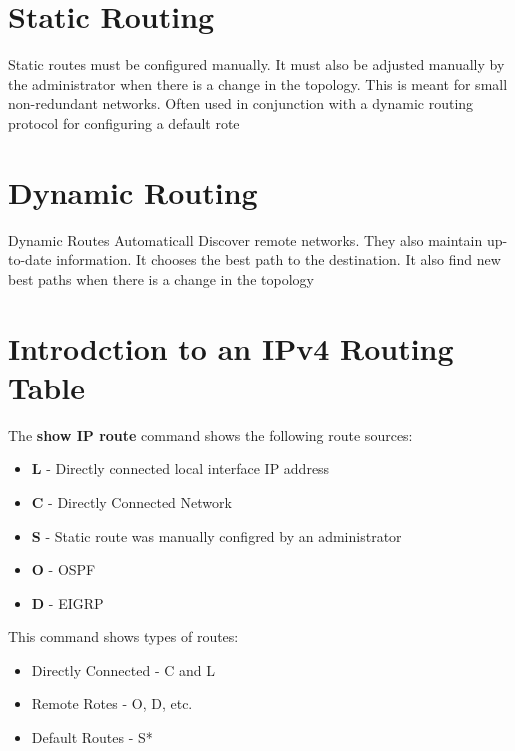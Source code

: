 \documentclass{article}
\begin{document}
\section{\textbf{Static Routing}}

\begin{flushleft}
    Static routes must be configured manually. It must also be adjusted manually by the administrator when there is a change 
    in the topology. This is meant for small non-redundant networks. Often used in conjunction with a dynamic routing protocol for
    configuring a default rote
\end{flushleft}

\section{\textbf{Dynamic Routing}}

\begin{flushleft}
    Dynamic Routes Automaticall Discover remote networks. They also maintain up-to-date information. It chooses the best path
    to the destination. It also find new best paths when there is a change in the topology
\end{flushleft}

\section{\textbf{Introdction to an IPv4 Routing Table}}
\begin{flushleft}
    The \textbf{show IP route} command shows the following route sources:

    \begin{itemize}
        \item \textbf{L} - Directly connected local interface IP address
        \item \textbf{C} - Directly Connected Network
        \item \textbf{S} - Static route was manually configred by an administrator
        \item \textbf{O} - OSPF
        \item \textbf{D} - EIGRP
    \end{itemize}

    This command shows types of routes:
    \begin{itemize}
        \item Directly Connected - C and L
        \item Remote Rotes - O, D, etc.
        \item Default Routes - S*
    \end{itemize}
\end{flushleft}
\end{document}

